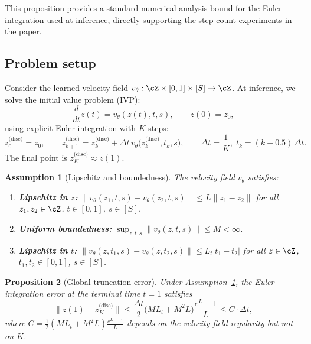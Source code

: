 \documentclass[letterpaper]{article}
\newtheorem{proposition}{Proposition}[section]
\newtheorem{assumption}[proposition]{Assumption}
\begin{document}
This proposition provides a standard numerical analysis bound for the
Euler integration used at inference, directly supporting the step-count
experiments in the paper.

\subsection{Problem setup}

Consider the learned velocity field $v_\theta : \cZ \times [0,1] \times [S] \to \cZ$.
At inference, we solve the initial value problem (IVP):
\begin{equation}
    \frac{d}{dt} z(t) = v_\theta(z(t), t, s), \qquad z(0) = z_0,
    \label{eq:ivp}
\end{equation}
using explicit Euler integration with $K$ steps:
\begin{equation}
    z_0^{\text{(disc)}} = z_0, \qquad
    z_{k+1}^{\text{(disc)}} = z_k^{\text{(disc)}} + \Delta t \,
        v_\theta\bigl(z_k^{\text{(disc)}}, t_k, s\bigr),
    \qquad \Delta t = \frac{1}{K},\; t_k = (k + 0.5)\, \Delta t.
    \label{eq:euler}
\end{equation}
The final point is $z_K^{\text{(disc)}} \approx z(1)$.

\begin{assumption}[Lipschitz and boundedness]
\label{asm:lipschitz}
The velocity field $v_\theta$ satisfies:
\begin{enumerate}[nosep]
    \item \textbf{Lipschitz in $z$:}
    $\|v_\theta(z_1, t, s) - v_\theta(z_2, t, s)\| \leq L \|z_1 - z_2\|$
    for all $z_1, z_2 \in \cZ$, $t \in [0,1]$, $s \in [S]$.
    \item \textbf{Uniform boundedness:}
    $\sup_{z,t,s} \|v_\theta(z, t, s)\| \leq M < \infty$.
    \item \textbf{Lipschitz in $t$:}
    $\|v_\theta(z, t_1, s) - v_\theta(z, t_2, s)\| \leq L_t |t_1 - t_2|$
    for all $z \in \cZ$, $t_1, t_2 \in [0,1]$, $s \in [S]$.
\end{enumerate}
\end{assumption}

\begin{proposition}[Global truncation error]
\label{prop:euler_error}
Under Assumption~\ref{asm:lipschitz}, the Euler integration error at the
terminal time $t=1$ satisfies
\begin{equation}
    \bigl\| z(1) - z_K^{\text{(disc)}} \bigr\|
    \leq \frac{\Delta t}{2} \bigl( M L_t + M^2 L \bigr)
        \frac{e^L - 1}{L}
    \leq C \cdot \Delta t,
    \label{eq:euler_error_bound}
\end{equation}
where $C = \frac{1}{2} (M L_t + M^2 L) \frac{e^L - 1}{L}$ depends on the
velocity field regularity but not on $K$.
\end{proposition}
\end{document}
